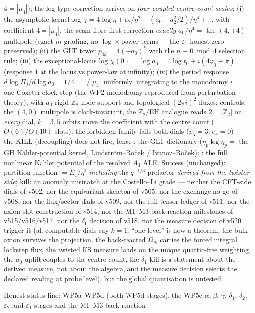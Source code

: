 \documentclass[11pt,a4paper]{article}
\newcommand{\Z}{\mathbb Z}
\begin{document}
\begin{itemize}
\begin{itemize}
$4=|\mu_4|$); the log-type correction arrives on \emph{four coupled centre-count scales}:
(i) the asymptotic kernel log $\chi=4\log\eta+a_2/\eta^2+(a_0-a_2^2/2)/\eta^4+\dots$ with
coefficient $4=|\mu_4|$, the seam-fibre first correction \emph{exactly} $a_0/\eta^4=$ the
$(4,\pm4)$ multipole (exact $m$-grading, no $\log\times$power terms --- the $\varepsilon_1$
honest zero preserved); (ii) the GLT tower $p_{4k}=4(-a_0)^k$ with the $n\equiv0\bmod4$
selection rule; (iii) the exceptional-locus log $\chi(0)=\log a_0=4\log t_0+i(4\varphi_0+\pi)$
(response $1$ at the locus vs power-law at infinity); (iv) the period response
$d\log\Pi_j/d\log a_0=1/4=1/|\mu_4|$ uniformly, integrating to the monodromy $i=$ one Coxeter
clock step (the WP2 monodromy reproduced from perturbation theory), with $a_0$-rigid $\Z_8$ node
support and topological $(2\pi i)^2$ fluxes; controls: the $(4,0)$ multipole is clock-invariant,
the $\Z_2$/EH analogue reads $2=|\Z_2|$ on \emph{every} dial, $k=3,5$ orbits move the
coefficient with the centre count ($O(6)/O(10)$ slots), the forbidden family fails both dials
($p_3=3$, $e_4=0$) --- the KILL (decoupling) does not fire; fence \mC: the GLT dictionary
($\eta_p\log\eta_p=$ the GH K\"ahler-potential kernel, Lindstr\"om--Ro\v{c}ek /
Ivanov--Ro\v{c}ek); \mO: the full nonlinear K\"ahler potential of the resolved $A_3$ ALE.
Success (unchanged): partition function $=E_4/\eta^8$
\emph{including} the
$q^{-1/3}$ prefactor \emph{derived from the twistor side}; kill: an anomaly mismatch at the
Costello--Li grade --- neither the CFT-side dials of v502, nor the equivariant skeleton of v505,
nor the exchange no-go of v508, nor the flux/sector dials of v509, nor the full-tensor ledger of
v511, nor the axion-slot construction of v514, nor the M1--M3 back-reaction milestones of
v515/v516/v517, nor the $\delta_1$ decision of v518, nor the measure decision of v520 trigger it (all computable
dials say $k=1$, ``one level'' is now a theorem, the bulk axion survives the projection, the
back-reacted $\Omega_N$ carries the forced integral lockstep flux, the twisted KS measure lands
on the unique quartic-free weighting, the $a_0$ uplift couples to the centre count, the
$\delta_1$ kill is a statement about the derived measure, not about the algebra, and the
measure decision selects the declared reading at probe level),
but the global
quantisation is untested.
\end{itemize}
Honest status line: WP5a--WP5d (both WP5d stages), the WP5e $\alpha$, $\beta$, $\gamma$,
$\delta_1$, $\delta_2$, $\varepsilon_2$ and $\varepsilon_1$ stages and the M1--M3 back-reaction

\end{itemize}
\end{document}

